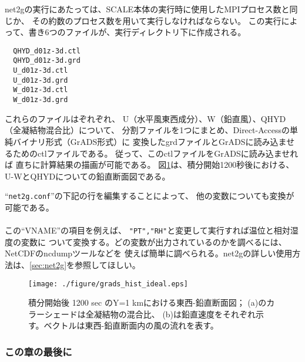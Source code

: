\noindent net2gの実行にあたっては、SCALE本体の実行時に使用したMPIプロセス数と同じか、
その約数のプロセス数を用いて実行しなければならない。
この実行によって、書き6つのファイルが、実行ディレクトリ下に作成される。
\begin{verbatim}
  QHYD_d01z-3d.ctl
  QHYD_d01z-3d.grd
  U_d01z-3d.ctl
  U_d01z-3d.grd
  W_d01z-3d.ctl
  W_d01z-3d.grd
\end{verbatim}
これらのファイルはぞれぞれ、
U（水平風東西成分）、W（鉛直風）、QHYD（全凝結物混合比）について、
分割ファイルを1つにまとめ、Direct-Accessの単純バイナリ形式（GrADS形式）に
変換したgrdファイルとGrADSに読み込ませるためのctlファイルである。
従って、このctlファイルをGrADSに読み込ませれば
直ちに計算結果の描画が可能である。
図\ref{fig_ideal}は、積分開始1200秒後における、
U-WとQHYDについての鉛直断面図である。


``\verb|net2g.conf|''の下記の行を編集することによって、
他の変数についても変換が可能である。\\

\\

\noindent この``VNAME''の項目を例えば、
\verb|"PT","RH"|と変更して実行すれば温位と相対湿度の変数に
ついて変換する。どの変数が出力されているのかを調べるには、NetCDFのncdumpツールなどを
使えば簡単に調べられる。net2gの詳しい使用方法は、\ref{sec:net2g}を参照してほしい。


\begin{figure}[t]
\begin{center}
  \texttt{[image: ./figure/grads\_hist\_ideal.eps]}\\
  \caption{積分開始後 1200 sec のY=1 kmにおける東西-鉛直断面図；
           (a)のカラーシェードは全凝結物の混合比、
           (b)は鉛直速度をそれぞれ示す。ベクトルは東西-鉛直断面内の風の流れを表す。}
  \label{fig_ideal}
\end{center}
\end{figure}




\subsubsection{この章の最後に}

